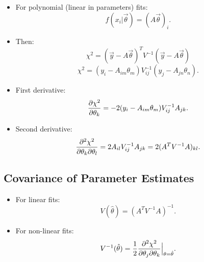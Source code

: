 \begin{itemize}
    \item For polynomial (linear in parameters) fits:
          \[
              f(x_i|\vec{\theta}) = (A \vec{\theta})_i .
          \]
    \item Then:
          \[
              \chi^2 = (\vec{y} - A \vec{\theta})^T V^{-1} (\vec{y} - A \vec{\theta})
          \]
          \[
              \chi^2 = (y_i - A_{im} \theta_m) V_{ij}^{-1} (y_j - A_{jn} \theta_n) .
          \]
    \item First derivative:
          \[
              \pdv{\chi^2}{\theta_k} = -2 (y_i - A_{im} \theta_m) V_{ij}^{-1} A_{jk} .
          \]
    \item Second derivative:
          \[
              \pdv{\chi^2}{\theta_k}{\theta_l} = 2 A_{il} V_{ij}^{-1} A_{jk} = 2 (A^T V^{-1} A)_{kl} .
          \]
\end{itemize}

\subsection{Covariance of Parameter Estimates}

\begin{itemize}
    \item For linear fits:
          \[
              V(\hat{\theta}) = (A^T V^{-1} A)^{-1} .
          \]
    \item For non-linear fits:
          \[
              V^{-1}(\hat{\theta}) = \frac{1}{2} \pdv[2]{\chi^2}{\theta_j}{\theta_k} \Big|_{\theta = \hat{\theta}} .
          \]
\end{itemize}

